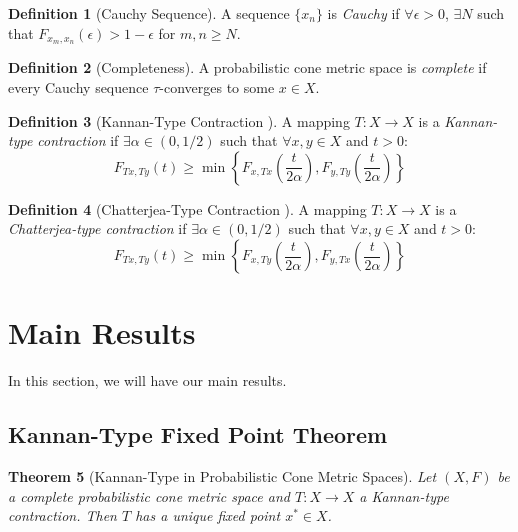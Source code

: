 \documentclass{amsart}
\newtheorem{theorem}{Theorem}[section]
\theoremstyle{definition}
\newtheorem{definition}[theorem]{Definition}
\theoremstyle{remark}
\numberwithin{equation}{section}
\begin{document}
\begin{definition}[Cauchy Sequence]
A sequence $\{x_n\}$ is \textit{Cauchy} if $\forall \epsilon > 0$, $\exists N$ such that $F_{x_m,x_n}(\epsilon) > 1 - \epsilon$ for $m,n \geq N$.
\end{definition}

\begin{definition}[Completeness]
A probabilistic cone metric space is \textit{complete} if every Cauchy sequence $\tau$-converges to some $x \in X$.
\end{definition}

\begin{definition}[Kannan-Type Contraction \cite{Kannan1968}]
A mapping $T: X \to X$ is a \textit{Kannan-type contraction} if $\exists \alpha \in (0,1/2)$ such that $\forall x,y \in X$ and $t > 0$:
\[
F_{Tx,Ty}(t) \geq \min\left\{ F_{x,Tx}\left(\frac{t}{2\alpha}\right), F_{y,Ty}\left(\frac{t}{2\alpha}\right) \right\}
\]
\end{definition}

\begin{definition}[Chatterjea-Type Contraction \cite{Chatterjea1972}]
A mapping $T: X \to X$ is a \textit{Chatterjea-type contraction} if $\exists \alpha \in (0,1/2)$ such that $\forall x,y \in X$ and $t > 0$:
\[
F_{Tx,Ty}(t) \geq \min\left\{ F_{x,Ty}\left(\frac{t}{2\alpha}\right), F_{y,Tx}\left(\frac{t}{2\alpha}\right) \right\}
\]
\end{definition}

\section{Main Results}
In this section, we will have our main results.

\subsection{Kannan-Type Fixed Point Theorem}

\begin{theorem}[Kannan-Type in Probabilistic Cone Metric Spaces]\label{thm:kannan-pcm}
Let $(X,F)$ be a complete probabilistic cone metric space and $T: X \to X$ a Kannan-type contraction. Then $T$ has a unique fixed point $x^* \in X$.
\end{theorem}
\end{document}
